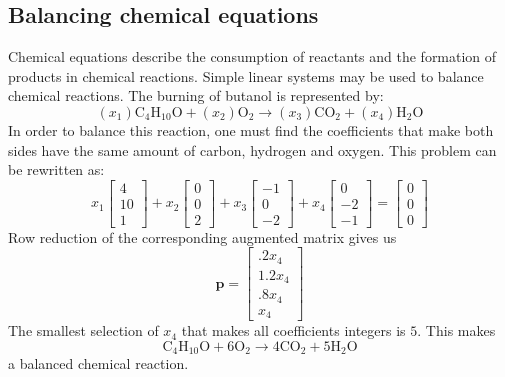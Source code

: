 \documentclass[12pt, oneside]{book}
\begin{document}
\subsection{Balancing chemical equations}
Chemical equations describe the consumption of reactants and the formation
of products in chemical reactions.
Simple linear systems may be used to balance chemical reactions.
The burning of butanol is represented by:
\[
\left( x_1 \right) \text{C}_4\text{H}_{10}\text{O} +
\left( x_2 \right) \text{O}_2 \rightarrow
\left( x_3 \right) \text{CO}_2 +
\left( x_4 \right) \text{H}_2\text{O}
\]
In order to balance this reaction,
one must find the coefficients that make both sides have the same amount of
carbon,
hydrogen and oxygen.
This problem can be rewritten as:
\[
x_1 \begin{bmatrix} 4 \\ 10 \\  1\end{bmatrix} +
x_2 \begin{bmatrix} 0 \\  0 \\  2\end{bmatrix} +
x_3 \begin{bmatrix}-1 \\  0 \\ -2\end{bmatrix} +
x_4 \begin{bmatrix} 0 \\ -2 \\ -1\end{bmatrix} =
\begin{bmatrix}0 \\ 0 \\ 0\end{bmatrix}
\]
Row reduction of the corresponding augmented matrix gives us
\[
\textbf{p} = \begin{bmatrix}.2x_4 \\ 1.2x_4 \\ .8x_4 \\ x_4\end{bmatrix}
\]
The smallest selection of \(x_4\) that makes all coefficients integers is \(5\).
This makes
\[
  \text{C}_4\text{H}_{10}\text{O} +
6 \text{O}_2 \rightarrow
4 \text{CO}_2 +
5 \text{H}_2\text{O}
\]
a balanced chemical reaction.
\end{document}
